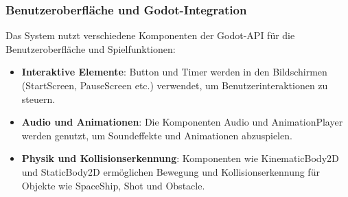 \documentclass[10pt]{article}
\begin{document}
\subsubsection{Benutzeroberfläche und Godot-Integration}

Das System nutzt verschiedene Komponenten der Godot-API für die Benutzeroberfläche und Spielfunktionen:

\begin{itemize}
    \item \textbf{Interaktive Elemente}: Button und Timer werden in den Bildschirmen (StartScreen, PauseScreen etc.) verwendet, um Benutzerinteraktionen zu steuern.

    \item \textbf{Audio und Animationen}: Die Komponenten Audio und AnimationPlayer werden genutzt, um Soundeffekte und Animationen abzuspielen.

    \item \textbf{Physik und Kollisionserkennung}: Komponenten wie KinematicBody2D und StaticBody2D ermöglichen Bewegung und Kollisionserkennung für Objekte wie SpaceShip, Shot und Obstacle.
\end{itemize}
\end{document}

